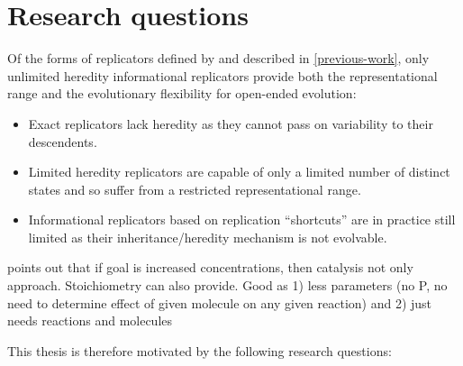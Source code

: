 \section{Research questions}\label{research-questions}

Of the forms of replicators defined by \textcite{Zachar2010} and described in \cref{previous-work}, only unlimited heredity informational replicators provide both the representational range and the evolutionary flexibility for open-ended evolution:

\begin{itemize}[noitemsep]
	\item Exact replicators lack heredity as they cannot pass on variability to their descendents.
	\item Limited heredity replicators are capable of only a limited number of distinct states and so suffer from a restricted representational range.
	\item Informational replicators based on replication ``shortcuts'' are in practice still limited as their inheritance/heredity mechanism is not evolvable.
\end{itemize} 
 
\Cite{Virgo2013} points out that if goal is increased concentrations, then catalysis not only approach. Stoichiometry can also provide.
Good as 1) less parameters (no P, no need to determine effect of given molecule on any given reaction) and 2) just needs reactions and molecules

This thesis is therefore motivated by the following research questions:

